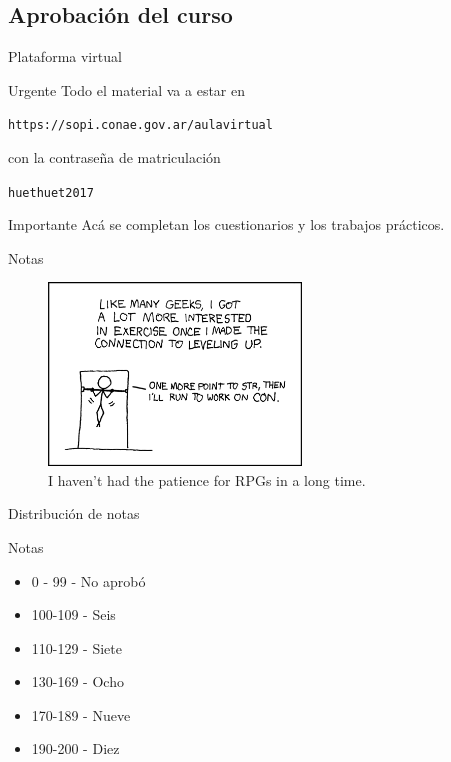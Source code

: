 \documentclass[]{beamer}
\begin{document}
\subsection{Aprobación del curso}
\begin{frame}{Plataforma virtual}
  \begin{block}{Urgente}
    Todo el material va a estar en
    \begin{center}
      \texttt{https://sopi.conae.gov.ar/aulavirtual}\pause
    \end{center}
    con la contraseña de matriculación
    \begin{center}
      \texttt{huethuet2017}
    \end{center}
  \end{block}\pause
  \begin{alertblock}{Importante}
    Acá se completan los cuestionarios y los trabajos prácticos.
  \end{alertblock}
\end{frame}

\begin{frame}{Notas}
  \begin{figure}
    \includegraphics[width=0.6\textwidth]{imagenes/exercise.png}
    \caption{I haven't had the patience for RPGs in a long time.}
  \end{figure}
\end{frame}

\begin{frame}{Distribución de notas}
    \begin{block}{Notas}
        \begin{itemize}[<+->]
        \item 0 - 99 - No aprobó
        \item 100-109 - Seis
        \item 110-129 - Siete
        \item 130-169 - Ocho
        \item 170-189 - Nueve
        \item 190-200 - Diez
      \end{itemize}
    \end{block}
\end{frame}
\end{document}
